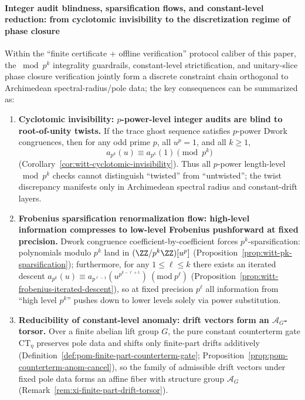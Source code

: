 \paragraph{Integer audit blindness, sparsification flows, and constant-level reduction: from cyclotomic invisibility to the discretization regime of phase closure}
Within the ``finite certificate + offline verification'' protocol caliber of this paper, the \(\bmod p^k\) integrality guardrails, constant-level strictification, and unitary-slice phase closure verification jointly form a discrete constraint chain orthogonal to Archimedean spectral-radius/pole data; the key consequences can be summarized as:
\begin{enumerate}
  \item \textbf{Cyclotomic invisibility: \texorpdfstring{$p$}{p}-power-level integer audits are blind to root-of-unity twists.}
  If the trace ghost sequence satisfies \(p\)-power Dwork congruences, then for any odd prime \(p\), all \(u^p=1\), and all \(k\ge 1\),
  \[
  a_{p^k}(u)\equiv a_{p^k}(1)\pmod{p^k}
  \]
  (Corollary~\ref{cor:witt-cyclotomic-invisibility}).
  Thus all \(p\)-power length-level \(\bmod p^k\) checks cannot distinguish ``twisted'' from ``untwisted''; the twist discrepancy manifests only in Archimedean spectral radius and constant-drift layers.

  \item \textbf{Frobenius sparsification renormalization flow: high-level information compresses to low-level Frobenius pushforward at fixed precision.}
  Dwork congruence coefficient-by-coefficient forces \(p^k\)-sparsification: polynomials modulo \(p^k\) land in \((\ZZ/p^k\ZZ)[u^p]\) (Proposition~\ref{prop:witt-pk-sparsification});
  furthermore, for any \(1\le \ell\le k\) there exists an iterated descent
  \(a_{p^k}(u)\equiv a_{p^{\ell-1}}(u^{p^{k-\ell+1}})\ (\mathrm{mod}\ p^\ell)\)
  (Proposition~\ref{prop:witt-frobenius-iterated-descent}), so at fixed precision \(p^\ell\) all information from ``high level \(p^k\)'' pushes down to lower levels solely via power substitution.

  \item \textbf{Reducibility of constant-level anomaly: drift vectors form an \texorpdfstring{$\mathcal{A}_G$}{AG}-torsor.}
  Over a finite abelian lift group \(G\), the pure constant counterterm gate \(\mathrm{CT}_\eta\) preserves pole data and shifts only finite-part drifts additively (Definition~\ref{def:pom-finite-part-counterterm-gate}; Proposition~\ref{prop:pom-counterterm-anom-cancel}),
  so the family of admissible drift vectors under fixed pole data forms an affine fiber with structure group \(\mathcal{A}_G\) (Remark~\ref{rem:xi-finite-part-drift-torsor}).


\end{enumerate}
